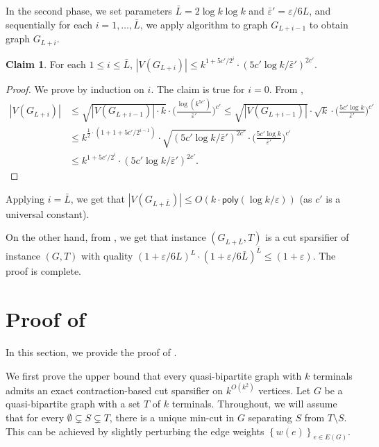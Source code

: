 \documentclass[11pt]{article}
\theoremstyle{definition}
\newtheorem{claim}[theorem]{Claim}
\newcommand{\set}[1]{\left\{ #1 \right\}}
\newcommand{\eps}{{\varepsilon}}
\newcommand{\poly}{\mathsf{poly}}
\begin{document}
In the second phase, we set parameters $\bar L=2\log k\log k$ and $\bar\eps'=\eps/6L$, and sequentially for each $i=1,\ldots,\bar L$, we apply algorithm  to graph $G_{L+i-1}$ to obtain graph $G_{L+i}$.

\begin{claim}
	For each $1\le i\le \bar L$, $|V(G_{L+i})|\le k^{1+5c'/2^i}\cdot (5c'\log k/\bar\eps')^{2c'}$.
\end{claim}
\begin{proof}
	We prove by induction on $i$. The claim is true for $i=0$.
	From ,
	\[
	\begin{split}
	|V(G_{L+i})| & \le \sqrt{|V(G_{L+i-1})|\cdot k}\cdot \bigg(\frac{\log (k^{5c'})}{\bar\eps'}\bigg)^{c'}
	\le 
	\sqrt{|V(G_{L+i-1})|}\cdot \sqrt{k}\cdot\bigg(\frac{5c'\log k}{\bar\eps'}\bigg)^{c'}\\
	& \le  k^{\frac{1}{2}\cdot (1+1+5c'/2^{i-1})}\cdot \sqrt{(5c'\log k/\bar\eps')^{2c'}}\cdot\bigg(\frac{5c'\log k}{\bar\eps'}\bigg)^{c'}\\
	& \le k^{1+5c'/2^i}\cdot (5c'\log k/\bar\eps')^{2c'}.
	\end{split}
	\]
\end{proof}
Applying $i=\bar L$, we get that $|V(G_{L+\bar L})|\le O(k\cdot \poly(\log k/\eps))$ (as $c'$ is a universal constant).

On the other hand, from , we get that instance $(G_{L+\bar L},T)$ is a cut sparsifier of  instance $(G,T)$ with quality
$(1+\eps/6L)^L\cdot (1+\eps/6\bar L)^{\bar L}\le (1+\eps)$. The proof is complete.









 
\section{Proof of }
\label{sec: quasi_exact}

In this section, we provide the proof of . 

We first prove the upper bound that every quasi-bipartite graph with $k$ terminals admits an exact contraction-based cut sparsifier on $k^{O(k^2)}$ vertices. 
Let $G$ be a quasi-bipartite graph with a set $T$ of $k$ terminals.
Throughout, we will assume that for every $\emptyset \subsetneq S\subsetneq T$, there is a unique min-cut in $G$ separating $S$ from $T\setminus S$. This can be achieved by slightly perturbing the edge weights $\set{w(e)}_{e\in E(G)}$.
\end{document}
